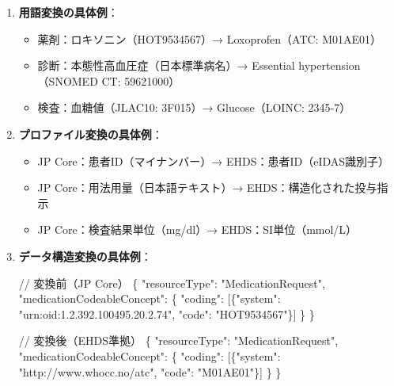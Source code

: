 \documentclass[
  a4paper,
  a4paper,
  11pt]{ltjsbook}
\newenvironment{Shaded}{\begin{snugshade}}{\end{snugshade}}
\newcommand{\DataTypeTok}[1]{\textcolor[rgb]{0.68,0.00,0.00}{#1}}
\newcommand{\ErrorTok}[1]{\textcolor[rgb]{0.68,0.00,0.00}{#1}}
\newcommand{\FunctionTok}[1]{\textcolor[rgb]{0.28,0.35,0.67}{#1}}
\newcommand{\OtherTok}[1]{\textcolor[rgb]{0.00,0.23,0.31}{#1}}
\newcommand{\StringTok}[1]{\textcolor[rgb]{0.13,0.47,0.30}{#1}}
\providecommand{\tightlist}{%
  \setlength{\itemsep}{0pt}\setlength{\parskip}{0pt}}
\begin{document}
\begin{enumerate}
\def\labelenumi{\arabic{enumi}.}
\item
  \textbf{用語変換の具体例}：

  \begin{itemize}
  \tightlist
  \item
    薬剤：ロキソニン（HOT9534567）→ Loxoprofen（ATC: M01AE01）
  \item
    診断：本態性高血圧症（日本標準病名）→ Essential hypertension（SNOMED
    CT: 59621000）
  \item
    検査：血糖値（JLAC10: 3F015）→ Glucose（LOINC: 2345-7）
  \end{itemize}
\item
  \textbf{プロファイル変換の具体例}：

  \begin{itemize}
  \tightlist
  \item
    JP Core：患者ID（マイナンバー）→ EHDS：患者ID（eIDAS識別子）
  \item
    JP Core：用法用量（日本語テキスト）→ EHDS：構造化された投与指示
  \item
    JP Core：検査結果単位（mg/dl）→ EHDS：SI単位（mmol/L）
  \end{itemize}
\item
  \textbf{データ構造変換の具体例}：

\begin{Shaded}
\begin{Highlighting}[]
\ErrorTok{//} \ErrorTok{変換前（JP} \ErrorTok{Core）}
\FunctionTok{\{}
  \DataTypeTok{"resourceType"}\FunctionTok{:} \StringTok{"MedicationRequest"}\FunctionTok{,}
  \DataTypeTok{"medicationCodeableConcept"}\FunctionTok{:} \FunctionTok{\{}
    \DataTypeTok{"coding"}\FunctionTok{:} \OtherTok{[}\FunctionTok{\{}\DataTypeTok{"system"}\FunctionTok{:} \StringTok{"urn:oid:1.2.392.100495.20.2.74"}\FunctionTok{,} \DataTypeTok{"code"}\FunctionTok{:} \StringTok{"HOT9534567"}\FunctionTok{\}}\OtherTok{]}
  \FunctionTok{\}}
\FunctionTok{\}}

\ErrorTok{//} \ErrorTok{変換後（EHDS準拠）}
\FunctionTok{\{}
  \DataTypeTok{"resourceType"}\FunctionTok{:} \StringTok{"MedicationRequest"}\FunctionTok{,} 
  \DataTypeTok{"medicationCodeableConcept"}\FunctionTok{:} \FunctionTok{\{}
    \DataTypeTok{"coding"}\FunctionTok{:} \OtherTok{[}\FunctionTok{\{}\DataTypeTok{"system"}\FunctionTok{:} \StringTok{"http://www.whocc.no/atc"}\FunctionTok{,} \DataTypeTok{"code"}\FunctionTok{:} \StringTok{"M01AE01"}\FunctionTok{\}}\OtherTok{]}
  \FunctionTok{\}}
\FunctionTok{\}}
\end{Highlighting}
\end{Shaded}
\end{enumerate}
\end{document}

